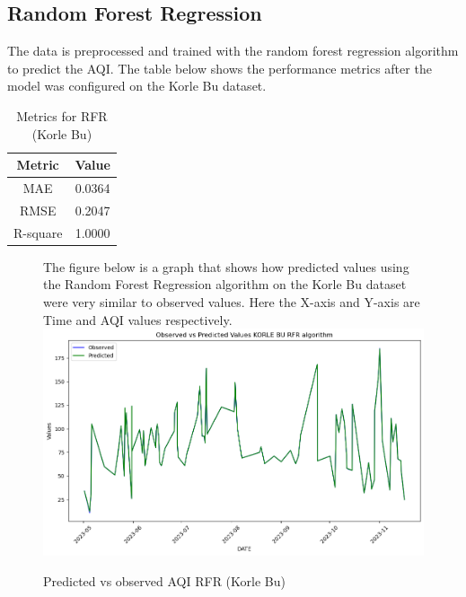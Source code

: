 \documentclass{book}
\numberwithin{equation}{section}
\numberwithin{figure}{section}
\begin{document}
\subsection{Random Forest Regression}
The data is preprocessed and trained with the random forest regression algorithm to predict the AQI. The table below shows the performance metrics after the model was configured on the Korle Bu dataset.
\begin{table}[H]
    \centering
    \begin{tabular}{|c|c|}
        \hline
        \textbf{Metric} & \textbf{Value} \\
        \hline
        MAE & 0.0364 \\
        \hline
        RMSE & 0.2047\\
        \hline
        R-square & 1.0000\\
        \hline
    \end{tabular}
    \caption{Metrics for RFR (Korle Bu)}
    \label{tab: RFR metrics(Korle Bu)}
\end{table}
\begin{figure}[H]
 \begin{minipage}{\linewidth}
        The figure below is a graph that shows how predicted values using the Random Forest Regression algorithm on the Korle Bu dataset were very similar to observed values. Here the X-axis and Y-axis are Time and AQI values respectively.
        \vspace{0.5em} 
        \includegraphics[width=\linewidth]{korle bu rfr.png}
       
        \caption{ Predicted vs observed AQI RFR (Korle Bu) }
        \label{fig: RFR Predicted vs observed AQI(Korle Bu)}
    \end{minipage}
\end{figure}
\end{document}
